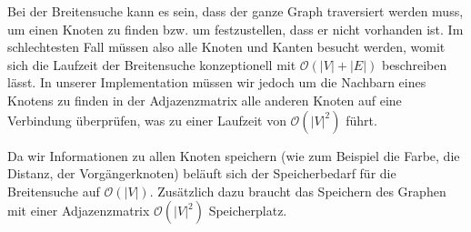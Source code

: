 \begin{lsg}
Bei der Breitensuche kann es sein, dass der ganze Graph traversiert werden muss, um einen Knoten zu finden bzw. um festzustellen, dass er nicht vorhanden ist. Im schlechtesten Fall m\"ussen also alle Knoten und Kanten besucht werden, womit sich die Laufzeit der Breitensuche konzeptionell mit $\mathcal{O}(|V| + |E|)$ beschreiben l\"asst. In unserer Implementation m\"ussen wir jedoch um die Nachbarn eines Knotens zu finden in der Adjazenzmatrix alle anderen Knoten auf eine Verbindung \"uberpr\"ufen, was zu einer Laufzeit von $\mathcal{O}(|V|^2)$ f\"uhrt.
\end{lsg}

\begin{lsg}
Da wir Informationen zu allen Knoten speichern (wie zum Beispiel die Farbe, die Distanz, der Vorg\"angerknoten) bel\"auft sich der Speicherbedarf f\"ur die Breitensuche auf  $\mathcal{O}(|V|)$. Zus\"atzlich dazu braucht das Speichern des Graphen mit einer Adjazenzmatrix $\mathcal{O}(|V|^2)$ Speicherplatz.
\end{lsg}




